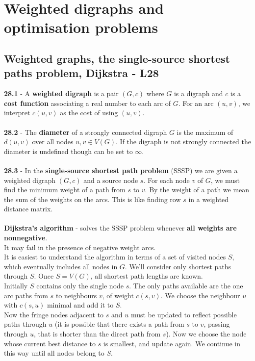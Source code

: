 \documentclass[a4paper]{article}
\begin{document}
\section{Weighted digraphs and optimisation problems}
\subsection*{Weighted graphs, the single-source shortest paths problem, Dijkstra - L28}
\textbf{28.1} - A \textbf{weighted digraph} is a pair $(G, c)$ where $G$ is a digraph and $c$ is
a \textbf{cost function} associating a real number to each arc of $G$. For an arc $(u, v)$, we
interpret $c(u, v)$ as the cost of using $(u, v)$.\\\\
\textbf{28.2} - The \textbf{diameter} of a strongly connected digraph $G$ is the maximum
of $d(u, v)$ over all nodes $u, v \in V(G)$. If the digraph is not strongly connected the
diameter is undefined though can be set to $\infty$.\\\\
\textbf{28.3} - In the \textbf{ single-source shortest path problem} (SSSP) we are given
a weighted digraph $(G, c)$ and a source node $s$. For each node $v$ of $G$, we must find
the minimum weight of a path from $s$ to $v$. By the weight of a path we mean the
sum of the weights on the arcs. This is like finding row $s$ in a weighted distance
matrix.\\\\
\textbf{Dijkstra’s algorithm} - solves the SSSP problem whenever \textbf{all weights are nonnegative}.\\
It may fail in the presence of negative weight arcs.\\
It is easiest to understand the algorithm in terms of a set of visited nodes $S$, which
eventually includes all nodes in $G$. We’ll consider only shortest paths through $S$.
Once $S = V(G)$, all shortest path lengths are known.\\
Initially $S$ contains only the single node $s$. The only paths available are the one arc
paths from $s$ to neighbours $v$, of weight $c(s, v)$. We choose the neighbour $u$ with
$c(s, u)$ minimal and add it to $S$.\\
Now the fringe nodes adjacent to $s$ and $u$ must be updated to reflect possible paths
through $u$ (it is possible that there exists a path from $s$ to $v$, passing through $u$, that
is shorter than the direct path from $s$). Now we choose the node whose current
best distance to $s$ is smallest, and update again. We continue in this way until all
nodes belong to $S$.
\end{document}
